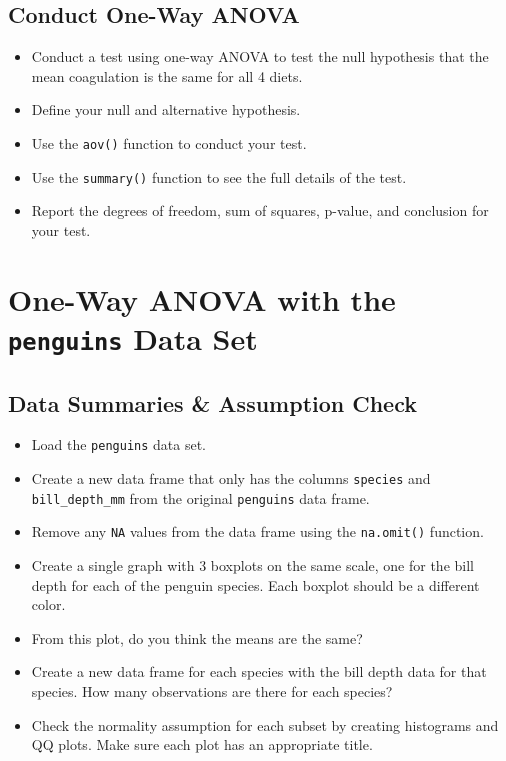 \documentclass{article}
\begin{document}
\subsection*{Conduct One-Way ANOVA}

\begin{itemize}
    \item Conduct a test using one-way ANOVA to test the null hypothesis that the mean coagulation is the same for all 4 diets.
    \item Define your null and alternative hypothesis.
    \item Use the \texttt{aov()} function to conduct your test.
    \item Use the \texttt{summary()} function to see the full details of the test.
    \item Report the degrees of freedom, sum of squares, p-value, and conclusion for your test.
\end{itemize}

\section*{One-Way ANOVA with the \texttt{penguins} Data Set}

\subsection*{Data Summaries \& Assumption Check}

\begin{itemize}
    \item Load the \texttt{penguins} data set.
    \item Create a new data frame that only has the columns \texttt{species} and \texttt{bill\_depth\_mm} from the original \texttt{penguins} data frame.
    \item Remove any \texttt{NA} values from the data frame using the \texttt{na.omit()} function.
    \item Create a single graph with 3 boxplots on the same scale, one for the bill depth for each of the penguin species. Each boxplot should be a different color.
    \item From this plot, do you think the means are the same?
    \item Create a new data frame for each species with the bill depth data for that species. How many observations are there for each species?
    \item Check the normality assumption for each subset by creating histograms and QQ plots. Make sure each plot has an appropriate title.
\end{itemize}
\end{document}
